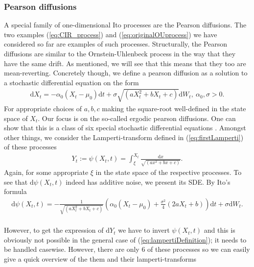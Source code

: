 \subsubsection{Pearson diffusions}
A special family of one-dimensional Ito processes are the Pearson diffusions. The two examples (\ref{eq:CIR_process}) and (\ref{eq:originalOUprocess}) we have considered so far are examples of such processes. Structurally, the Pearson diffusions are similar to the Ornstein-Uhlenbeck process in the way that they have the same drift. As mentioned, we will see that this means that they too are mean-reverting. Concretely though, we define a pearson diffusion as a solution to a stochastic differential equation on the form
\begin{align}
    \mathrm{d}X_t = -\alpha_0 \left(X_t - \mu_0\right)\mathrm{d}t + \sigma\sqrt{\left(aX_t^2 + bX_t + c\right)}\mathrm{d}W_t, \: \alpha_0, \sigma > 0. \label{eq:pearsonDiffusion}
\end{align}
For appropriate choices of $a, b, c$ making the square-root well-defined in the state space of $X_t$. Our focus is on the so-called ergodic pearson diffusions. One can show that this is a class of six special stochastic differential equations \cite[p.36]{StatisticalMethodsForSDE}. Amongst other things, we consider the Lamperti-transform defined in (\ref{eq:firstLamperti}) of these processes
\begin{align}
    Y_t := \psi\left(X_t, t\right) = \int_{\xi}^{X_t} \frac{\mathrm{d}x}{\sqrt{\left(ax^2 + bx + c\right)}}. \label{eq:lampertiDefinition}
\end{align}
Again, for some appropriate $\xi$ in the state space of the respective processes. To see that $\mathrm{d}\psi\left(X_t, t\right)$ indeed has additive noise, we present its SDE. By Ito's formula
\begin{align}
    \mathrm{d}\psi\left(X_t, t\right) = - \frac{1}{\sqrt{\left(aX_t^2 + bX_t + c\right)}}\left(\alpha_0\left(X_t - \mu_0\right) + \frac{\sigma^2}{4}\left(2aX_t + b\right)\right)\mathrm{d}t + \sigma \mathrm{d}W_t.
\end{align}\\
However, to get the expression of $\mathrm{d}Y_t$ we have to invert $\psi\left(X_t, t\right)$ and this is obviously not possible in the general case of (\ref{eq:lampertiDefinition}); it needs to be handled casewise. However, there are only 6 of these processes so we can easily give a quick overview of the them \cite[p.36]{StatisticalMethodsForSDE} and their lamperti-transforms
